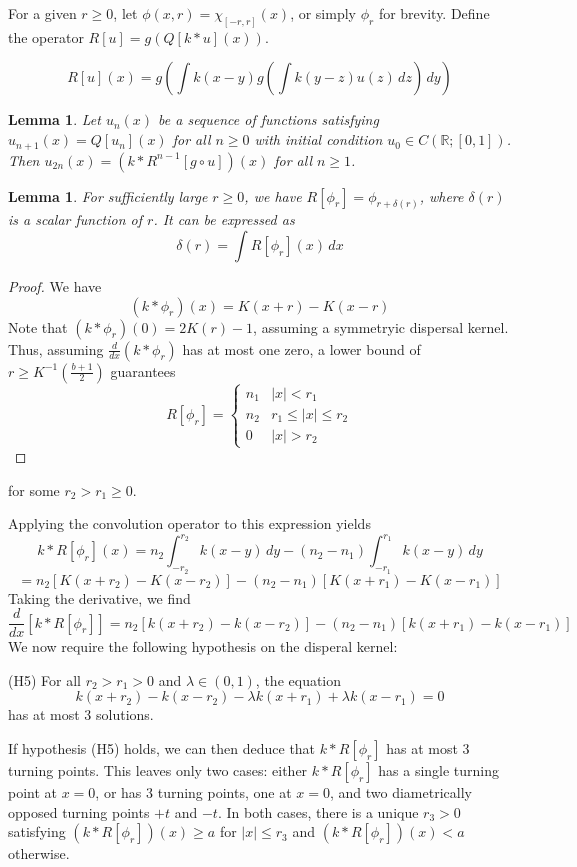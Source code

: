\documentclass[11pt]{article}
\newtheorem{lem}[thm]{Lemma}
\theoremstyle{definition}
\numberwithin{equation}{section}
\numberwithin{thm}{section}
\renewcommand{\a}{a}
\renewcommand{\b}{b}
\begin{document}
For a given $r \geq 0$, let $\phi(x,r) = \chi_{[-r,r]}(x)$, or simply $\phi_r$ for brevity. Define the operator $R[u] = g\left( Q[k*u](x) \right)$.

\begin{equation}
R[u](x) = g\left( \int k(x-y) g\left( \int k(y-z) u(z) \, dz \right) \, dy \right)
\end{equation}

\begin{lem}
Let $u_n(x)$ be a sequence of functions satisfying $u_{n+1}(x)=Q[u_n](x)$ for all $n \geq 0$ with initial condition $u_0 \in C(\mathbb R; [0,1])$. Then $u_{2n}(x) = (k*R^{n-1}[g\circ u])(x)$ for all $n\geq1 $.
\end{lem}

\begin{lem}
For sufficiently large $r \geq 0$, we have $R[\phi_r] = \phi_{r+\delta(r)}$, where $\delta(r)$ is a scalar function of $r$. It can be expressed as
$$ \delta(r) = \int R[\phi_r](x)  \, dx $$
\end{lem}

\begin{proof}
We have
$$ (k*\phi_r)(x) = K(x+r) - K(x-r) $$
Note that $(k*\phi_r)(0) = 2K(r)-1$, assuming a symmetryic dispersal kernel. Thus, assuming $\frac{d}{dx}(k*\phi_r)$ has at most one zero, a lower bound of $r \geq K^{-1}\left(\frac{\b+1}{2}\right)$ guarantees 
$$ R[\phi_r] = \begin{cases}
n_1 & |x| < r_1 \\
n_2 & r_1 \leq |x| \leq r_2 \\
0 & |x| > r_2
\end{cases} $$
\end{proof}
for some $r_2 > r_1 \geq 0$. 

Applying the convolution operator to this expression yields
$$ k*R[\phi_r] (x) = n_2 \int_{-r_2}^{r_2} k(x-y)\,dy - (n_2-n_1) \int_{-r_1}^{r_1} k(x-y) \, dy $$
$$ = n_2 \left[ K(x+r_2) - K(x-r_2)  \right] - (n_2-n_1) \left[ K(x+r_1) - K(x-r_1) \right] $$
Taking the derivative, we find
$$ \frac{d}{dx} \left[ k*R[\phi_r] \right] = n_2 \left[ k(x+r_2) - k(x-r_2)  \right] - (n_2-n_1) \left[ k(x+r_1) - k(x-r_1)\right] $$
We now require the following hypothesis on the disperal kernel:

(H5) For all $r_2>r_1>0$ and $\lambda \in (0,1)$, the equation
$$ k(x+r_2) - k(x-r_2) - \lambda k(x+r_1) + \lambda k(x-r_1) = 0 $$
has at most 3 solutions.

If hypothesis (H5) holds, we can then deduce that $k*R[\phi_r]$ has at most 3 turning points. This leaves only two cases: either $k*R[\phi_r]$ has a single turning point at $x=0$, or has 3 turning points, one at $x=0$, and two diametrically opposed turning points $+t$ and $-t$. In both cases, there is a unique $r_3>0$ satisfying $(k*R[\phi_r])(x) \geq \a$ for $|x| \leq r_3$ and $(k*R[\phi_r])(x) < \a$ otherwise. 
\end{document}
